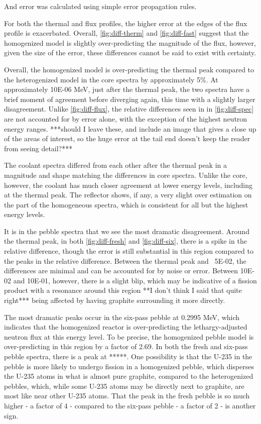 And error was calculated using simple error propagation rules.




For both the thermal and flux profiles, the higher error at the edges of the flux profile is exacerbated.  Overall, \ref{fig:diff-therm} and \ref{fig:diff-fast} suggest that the homogenized model is slightly over-predicting the magnitude of the flux, however, given the size of the error, these differences cannot be said to exist with certainty.




Overall, the homogenized model is over-predicting the thermal peak compared to the heterogenized model in the core spectra by approximately 5\%.  At approximately 10E-06 MeV, just after the thermal peak, the two spectra have a brief moment of agreement before diverging again, this time with a slightly larger disagreement.  Unlike \ref{fig:diff-flux}, the relative differences seen in in \ref{fig:diff-spec} are not accounted for by error alone, with the exception of the highest neutron energy ranges. ***should I leave these, and include an image that gives a close up of the areas of interest, so the huge error at the tail end doesn't keep the reader from seeing detail?***  

The coolant spectra differed from each other after the thermal peak in a magnitude and shape matching the differences in core spectra.  Unlike the core, however, the coolant has much closer agreement at lower energy levels, including at the thermal peak.  The reflector shows, if any, a very slight over estimation on the part of the homogeneous spectra, which is consistent for all but the highest energy levels.

It is in the pebble spectra that we see the most dramatic disagreement.  Around the thermal peak, in both \ref{fig:diff-fresh} and \ref{fig:diff-six}, there is a spike in the relative difference, though the error is still substantial in this region compared to the peaks in the relative difference.  Between the thermal peak and ~5E-02, the differences are minimal and can be accounted for by noise or error.  Between 10E-02 and 10E-01, however, there is a slight blip, which may be indicative of a fission product with a resonance around this region **I don't think I said that quite right*** being affected by having graphite surrounding it more directly.

The most dramatic peaks occur in the six-pass pebble at 0.2995 MeV, which indicates that the homogenized reactor is over-predicting the lethargy-adjusted neutron flux at this energy level.  To be precise, the homogenized pebble model is over-predicting in this region by a factor of 2.69.  In both the fresh and six-pass pebble spectra, there is a peak at *****.  One possibility is that the U-235 in the pebble is more likely to undergo fission in a homogenized pebble, which disperses the U-235 atoms in what is almost pure graphite, compared to the heterogenized pebbles, which, while some U-235 atoms may be directly next to graphite, are most like near other U-235 atoms.  That the peak in the fresh pebble is so much higher - a factor of 4 - compared to the six-pass pebble - a factor of 2 - is another sign.



